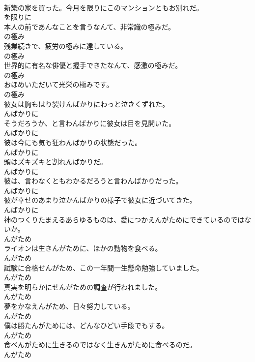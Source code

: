 \documentclass[8pt]{extreport}
\begin{document}
\begin{CJK}{UTF8}{min}
\\	新築の家を買った。今月を限りにこのマンションともお別れだ。	
\\	を限りに	
\\	本人の前であんなことを言うなんて、非常識の極みだ。	
\\	の極み	
\\	残業続きで、疲労の極みに達している。	
\\	の極み	
\\	世界的に有名な俳優と握手できたなんて、感激の極みだ。	
\\	の極み	
\\	おほめいただいて光栄の極みです。	
\\	の極み	
\\	彼女は胸もはり裂けんばかりにわっと泣きくずれた。	
\\	んばかりに	
\\	そうだろうか、と言わんばかりに彼女は目を見開いた。	
\\	んばかりに	
\\	彼は今にも気も狂わんばかりの状態だった。	
\\	んばかりに	
\\	頭はズキズキと割れんばかりだ。	
\\	んばかりに	
\\	彼は、言わなくともわかるだろうと言わんばかりだった。	
\\	んばかりに	
\\	彼が幸せのあまり泣かんばかりの様子で彼女に近づいてきた。	
\\	んばかりに	
\\	神のつくりたまえるあらゆるものは、愛につかえんがためにできているのではないか。	
\\	んがため	
\\	ライオンは生きんがために、ほかの動物を食べる。	
\\	んがため	
\\	試験に合格せんがため、この一年間一生懸命勉強していました。	
\\	んがため	
\\	真実を明らかにせんがための調査が行われました。	
\\	んがため	
\\	夢をかなえんがため、日々努力している。	
\\	んがため	
\\	僕は勝たんがためには、どんなひどい手段でもする。	
\\	んがため	
\\	食べんがために生きるのではなく生きんがために食べるのだ。	
\\	んがため	

\end{CJK}
\end{document}
